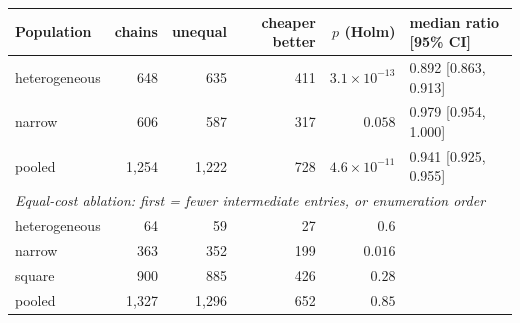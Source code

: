 \begin{tabular}{lrrrrl}
\toprule
Population & chains & unequal & cheaper better & $p$ (Holm) & median ratio [95\% CI]\\
\midrule
heterogeneous & 648 & 635 & 411 & $3.1\times10^{-13}$ & 0.892 [0.863, 0.913]\\
narrow & 606 & 587 & 317 & $0.058$ & 0.979 [0.954, 1.000]\\
pooled & 1,254 & 1,222 & 728 & $4.6\times10^{-11}$ & 0.941 [0.925, 0.955]\\
\midrule
\multicolumn{6}{l}{\emph{Equal-cost ablation: first = fewer intermediate entries, or enumeration order}}\\
heterogeneous & 64 & 59 & 27 & $0.6$ & \\
narrow & 363 & 352 & 199 & $0.016$ & \\
square & 900 & 885 & 426 & $0.28$ & \\
pooled & 1,327 & 1,296 & 652 & $0.85$ & \\
\bottomrule
\end{tabular}
